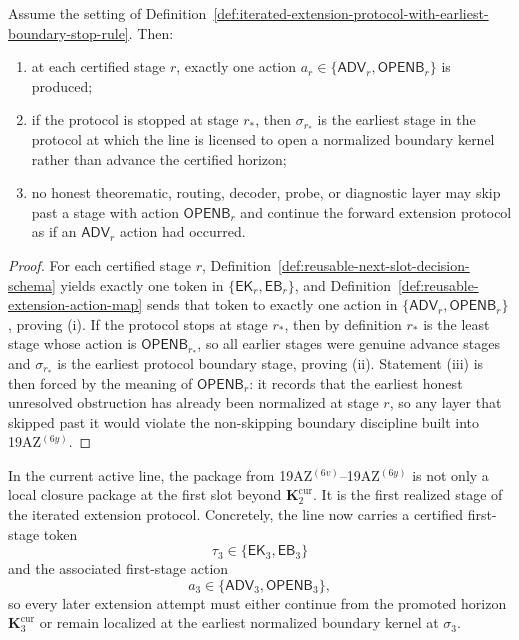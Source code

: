 \begin{proposition}
\label{prop:iterated-extension-protocol-is-well-defined-and-locally-non-skipping}
Assume the setting of Definition~\ref{def:iterated-extension-protocol-with-earliest-boundary-stop-rule}. Then:
\begin{enumerate}[label=(\roman*)]
  \item at each certified stage $r$, exactly one action $a_r\in\{\mathsf{ADV}_r,\mathsf{OPENB}_r\}$ is produced;
  \item if the protocol is stopped at stage $r_*$, then $\sigma_{r_*}$ is the earliest stage in the protocol at which the line is licensed to open a normalized boundary kernel rather than advance the certified horizon;
  \item no honest theorematic, routing, decoder, probe, or diagnostic layer may skip past a stage with action $\mathsf{OPENB}_r$ and continue the forward extension protocol as if an $\mathsf{ADV}_r$ action had occurred.
\end{enumerate}
\end{proposition}

\begin{proof}
For each certified stage $r$, Definition~\ref{def:reusable-next-slot-decision-schema} yields exactly one token in $\{\mathsf{EK}_r,\mathsf{EB}_r\}$, and Definition~\ref{def:reusable-extension-action-map} sends that token to exactly one action in $\{\mathsf{ADV}_r,\mathsf{OPENB}_r\}$, proving (i). If the protocol stops at stage $r_*$, then by definition $r_*$ is the least stage whose action is $\mathsf{OPENB}_{r_*}$, so all earlier stages were genuine advance stages and $\sigma_{r_*}$ is the earliest protocol boundary stage, proving (ii). Statement (iii) is then forced by the meaning of $\mathsf{OPENB}_r$: it records that the earliest honest unresolved obstruction has already been normalized at stage $r$, so any layer that skipped past it would violate the non-skipping boundary discipline built into 19AZ$^{(6y)}$.
\end{proof}

\begin{corollary}
\label{cor:present-sigma3-package-is-first-step-of-iterated-extension-protocol}
In the current active line, the package from 19AZ$^{(6v)}$--19AZ$^{(6y)}$ is not only a local closure package at the first slot beyond $\mathbf K_2^{\mathrm{cur}}$. It is the first realized stage of the iterated extension protocol. Concretely, the line now carries a certified first-stage token
\[
  \tau_3 \in \{\mathsf{EK}_3,\mathsf{EB}_3\}
\]
and the associated first-stage action
\[
  a_3 \in \{\mathsf{ADV}_3,\mathsf{OPENB}_3\},
\]
so every later extension attempt must either continue from the promoted horizon $\mathbf K_3^{\mathrm{cur}}$ or remain localized at the earliest normalized boundary kernel at $\sigma_3$.
\end{corollary}

